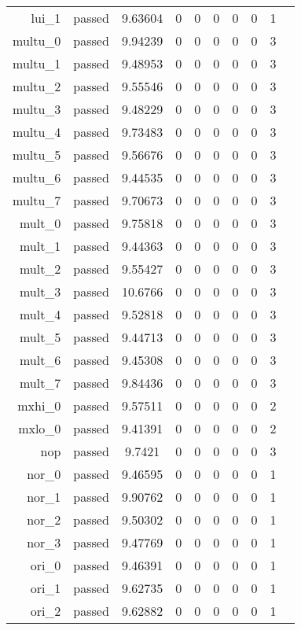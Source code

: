 \begin{longtable}{r|ccccccccc}
    lui\_1 & passed & 9.63604 & 0 & 0 & 0 & 0 & 0 & 1 \\
    multu\_0 & passed & 9.94239 & 0 & 0 & 0 & 0 & 0 & 3 \\
    multu\_1 & passed & 9.48953 & 0 & 0 & 0 & 0 & 0 & 3 \\
    multu\_2 & passed & 9.55546 & 0 & 0 & 0 & 0 & 0 & 3 \\
    multu\_3 & passed & 9.48229 & 0 & 0 & 0 & 0 & 0 & 3 \\
    multu\_4 & passed & 9.73483 & 0 & 0 & 0 & 0 & 0 & 3 \\
    multu\_5 & passed & 9.56676 & 0 & 0 & 0 & 0 & 0 & 3 \\
    multu\_6 & passed & 9.44535 & 0 & 0 & 0 & 0 & 0 & 3 \\
    multu\_7 & passed & 9.70673 & 0 & 0 & 0 & 0 & 0 & 3 \\
    mult\_0 & passed & 9.75818 & 0 & 0 & 0 & 0 & 0 & 3 \\
    mult\_1 & passed & 9.44363 & 0 & 0 & 0 & 0 & 0 & 3 \\
    mult\_2 & passed & 9.55427 & 0 & 0 & 0 & 0 & 0 & 3 \\
    mult\_3 & passed & 10.6766 & 0 & 0 & 0 & 0 & 0 & 3 \\
    mult\_4 & passed & 9.52818 & 0 & 0 & 0 & 0 & 0 & 3 \\
    mult\_5 & passed & 9.44713 & 0 & 0 & 0 & 0 & 0 & 3 \\
    mult\_6 & passed & 9.45308 & 0 & 0 & 0 & 0 & 0 & 3 \\
    mult\_7 & passed & 9.84436 & 0 & 0 & 0 & 0 & 0 & 3 \\
    mxhi\_0 & passed & 9.57511 & 0 & 0 & 0 & 0 & 0 & 2 \\
    mxlo\_0 & passed & 9.41391 & 0 & 0 & 0 & 0 & 0 & 2 \\
    nop & passed & 9.7421 & 0 & 0 & 0 & 0 & 0 & 3 \\
    nor\_0 & passed & 9.46595 & 0 & 0 & 0 & 0 & 0 & 1 \\
    nor\_1 & passed & 9.90762 & 0 & 0 & 0 & 0 & 0 & 1 \\
    nor\_2 & passed & 9.50302 & 0 & 0 & 0 & 0 & 0 & 1 \\
    nor\_3 & passed & 9.47769 & 0 & 0 & 0 & 0 & 0 & 1 \\
    ori\_0 & passed & 9.46391 & 0 & 0 & 0 & 0 & 0 & 1 \\
    ori\_1 & passed & 9.62735 & 0 & 0 & 0 & 0 & 0 & 1 \\
    ori\_2 & passed & 9.62882 & 0 & 0 & 0 & 0 & 0 & 1 \\

\end{longtable}
